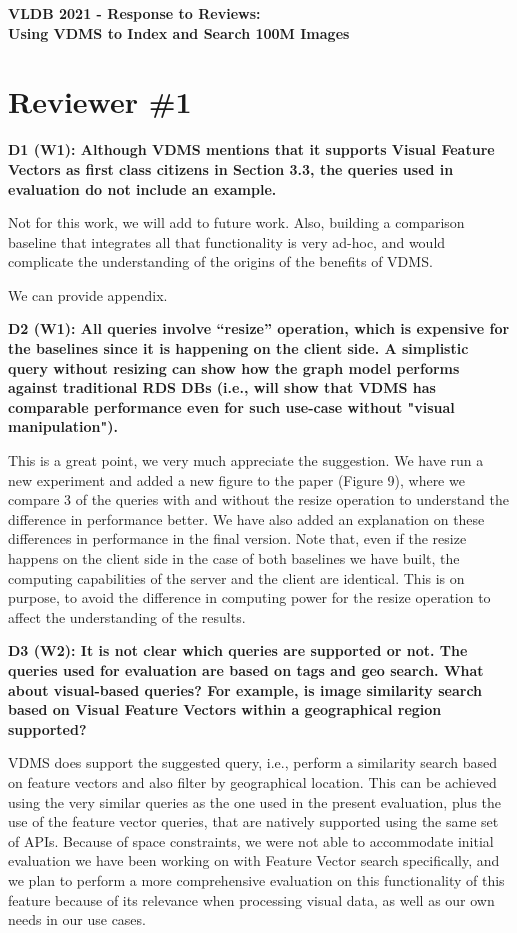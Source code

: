 \documentclass[11pt]{proposalnsf}
\begin{document}
\begin{center}
{\Large{\bf VLDB 2021 - Response to Reviews: \\
Using VDMS to Index and Search 100M Images}}

\end{center}

\section{Reviewer \#1}

\textbf{
D1 (W1): Although VDMS mentions that it supports Visual Feature Vectors as
first class citizens in Section 3.3, the queries used in evaluation
do not include an example.
}\bigskip


Not for this work, we will add to future work.
Also, building a comparison baseline that integrates all that functionality
is very ad-hoc, and would complicate the understanding of the origins
of the benefits of VDMS.

We can provide appendix.

\bigskip
\textbf{
D2 (W1): All queries involve “resize” operation, which is expensive for the
baselines since it is happening on the client side.
A simplistic query without resizing can show how the graph model performs
against traditional RDS DBs (i.e., will show that VDMS has comparable
performance even for such use-case without "visual manipulation").
}\bigskip

This is a great point, we very much appreciate the suggestion.
We have run a new experiment and added a new figure to the paper (Figure 9),
where we compare 3 of the queries with and without the resize operation
to understand the difference in performance better.
We have also added an explanation on these differences in performance
in the final version.
Note that, even if the resize happens on the client side in the case of both
baselines we have built, the computing capabilities of the server and the
client are identical. This is on purpose, to avoid the difference in
computing power for the resize operation to affect the understanding
of the results.


\bigskip
\textbf{
D3 (W2): It is not clear which queries are supported or not.
The queries used for evaluation are based on tags and geo search.
What about visual-based queries? For example, is image similarity search based
on Visual Feature Vectors within a geographical region supported?
}\bigskip

VDMS does support the suggested query, i.e., perform a similarity search based
on feature vectors and also filter by geographical location.
This can be achieved using the very similar queries as the one used in
the present evaluation, plus the use of the feature vector queries,
that are natively supported using the same set of APIs.
Because of space constraints, we were not able to accommodate initial evaluation
we have been working on with Feature Vector search specifically,
and we plan to perform a more comprehensive evaluation on this functionality
of this feature because of its relevance when processing visual data, as well
as our own needs in our use cases.
\end{document}
